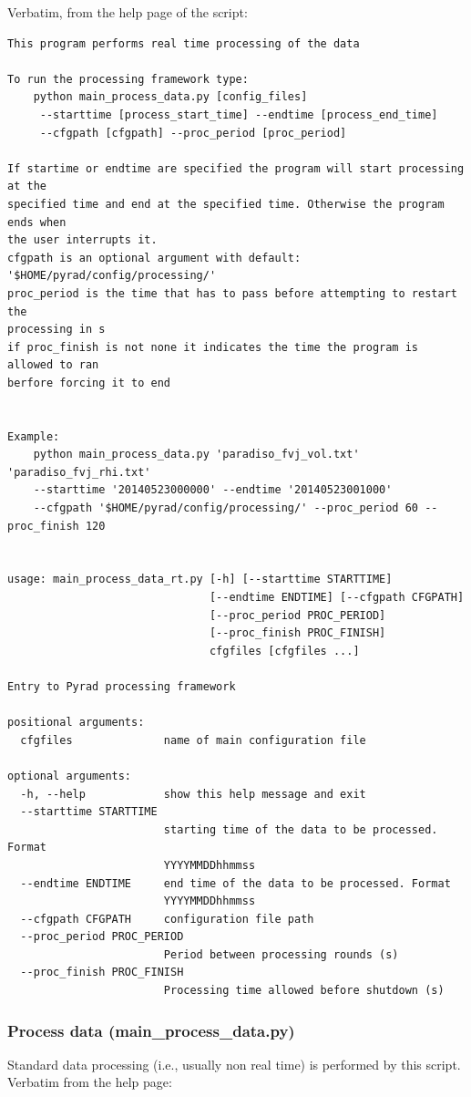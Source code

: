 \documentclass[a4paper,11pt,pdftex,twoside]{scrartcl}
\begin{document}
Verbatim, from the help page of the script:
\begin{verbatim}
This program performs real time processing of the data

To run the processing framework type:
    python main_process_data.py [config_files] 
     --starttime [process_start_time] --endtime [process_end_time] 
     --cfgpath [cfgpath] --proc_period [proc_period]

If startime or endtime are specified the program will start processing at the
specified time and end at the specified time. Otherwise the program ends when
the user interrupts it.
cfgpath is an optional argument with default: '$HOME/pyrad/config/processing/'
proc_period is the time that has to pass before attempting to restart the
processing in s
if proc_finish is not none it indicates the time the program is allowed to ran
berfore forcing it to end


Example:
    python main_process_data.py 'paradiso_fvj_vol.txt' 'paradiso_fvj_rhi.txt' 
    --starttime '20140523000000' --endtime '20140523001000' 
    --cfgpath '$HOME/pyrad/config/processing/' --proc_period 60 --proc_finish 120


usage: main_process_data_rt.py [-h] [--starttime STARTTIME]
                               [--endtime ENDTIME] [--cfgpath CFGPATH]
                               [--proc_period PROC_PERIOD]
                               [--proc_finish PROC_FINISH]
                               cfgfiles [cfgfiles ...]

Entry to Pyrad processing framework

positional arguments:
  cfgfiles              name of main configuration file

optional arguments:
  -h, --help            show this help message and exit
  --starttime STARTTIME
                        starting time of the data to be processed. Format
                        YYYYMMDDhhmmss
  --endtime ENDTIME     end time of the data to be processed. Format
                        YYYYMMDDhhmmss
  --cfgpath CFGPATH     configuration file path
  --proc_period PROC_PERIOD
                        Period between processing rounds (s)
  --proc_finish PROC_FINISH
                        Processing time allowed before shutdown (s)

\end{verbatim}

\subsubsection{Process data (main\_process\_data.py)}
Standard data processing (i.e., usually non real time) is performed by this script.
Verbatim from the help page:
\end{document}
